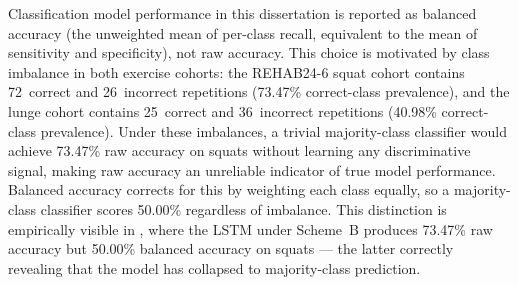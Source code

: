 Classification model performance in this dissertation is reported as balanced accuracy (the unweighted mean of per-class recall, equivalent to the mean of sensitivity and specificity), not raw accuracy. This choice is motivated by class imbalance in both exercise cohorts: the REHAB24-6 squat cohort contains 72~correct and 26~incorrect repetitions (73.47\% correct-class prevalence), and the lunge cohort contains 25~correct and 36~incorrect repetitions (40.98\% correct-class prevalence). Under these imbalances, a trivial majority-class classifier would achieve 73.47\% raw accuracy on squats without learning any discriminative signal, making raw accuracy an unreliable indicator of true model performance. Balanced accuracy corrects for this by weighting each class equally, so a majority-class classifier scores 50.00\% regardless of imbalance. This distinction is empirically visible in , where the LSTM under Scheme~B produces 73.47\% raw accuracy but 50.00\% balanced accuracy on squats --- the latter correctly revealing that the model has collapsed to majority-class prediction.
